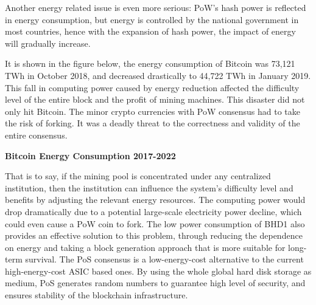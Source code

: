 \begin{flushleft}
    Another energy related issue is even more serious: PoW's hash power is reflected in energy consumption, but energy is controlled by the national government in most countries, hence with the expansion of hash power, the impact of energy will gradually increase.
\end{flushleft}
\begin{flushleft}
    It is shown in the figure below, the energy consumption of Bitcoin was 73,121 TWh in October 2018, and decreased drastically to 44,722 TWh in January 2019. This fall in computing power caused by energy reduction affected the difficulty level of the entire block and the profit of mining machines. This disaster did not only hit Bitcoin. The minor crypto currencies with PoW consensus had to take the risk of forking. It was a deadly threat to the correctness and validity of the entire consensus.
\end{flushleft}
\begin{flushleft}
    \centering\textbf{Bitcoin Energy Consumption 2017-2022}
\end{flushleft}

\begin{flushleft}
    That is to say, if the mining pool is concentrated under any centralized institution, then the institution can influence the system's difficulty level and benefits by adjusting the relevant energy resources. The computing power would drop dramatically due to a potential large-scale electricity power decline, which could even cause a PoW coin to fork. The low power consumption of BHD1 also provides an effective solution to this problem, through reducing the dependence on energy and taking a block generation approach that is more suitable for long-term survival. The PoS consensus is a low-energy-cost alternative to the current high-energy-cost ASIC based ones. By using the whole global hard disk storage as medium, PoS generates random numbers to guarantee high level of security, and ensures stability of the blockchain infrastructure.
\end{flushleft}
